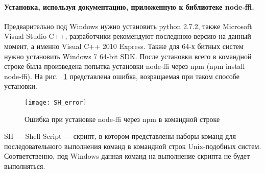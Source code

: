 \paragraph{Установка, используя документацию, приложенную к библиотеке node-ffi.}
Предварительно под Windows нужно установить python 2.7.2, также Microsoft Visual Studio C++, разработчики рекомендуют последнюю версию на данный момент, а именно Visual C++ 2010 Express. Также для 64-х битных систем нужно установить Windows 7 64-bit SDK.
После установки всего в командной строке была произведена попытка установки node-ffi через npm (npm install node-ffi). На рис. ~\ref{sh_error} представлена ошибка, возращаемая при таком способе установки. 
\begin{figure}[!ht]
	\begin{center}
		\texttt{[image: SH\_error]}
	\end{center}
	\caption{Ошибка при установке node-ffi через npm в командной строке}
	\label{sh_error}
\end{figure}
SH — Shell Script — скрипт, в котором представлены наборы команд для последовательного выполнения команд в командной строк Unix-подобных систем. Соответственно, под Windows данная команд на выполнение скрипта не будет выполняться.
\newpage

